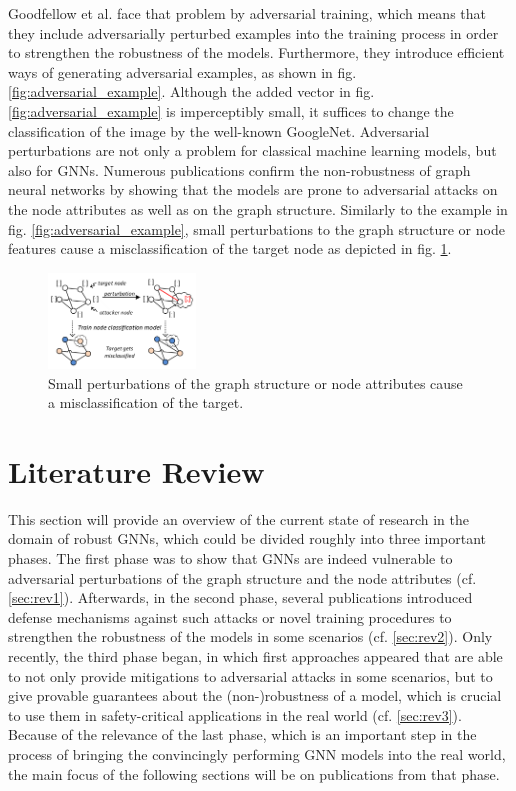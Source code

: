 \documentclass[a4paper,preprint]{sig-alternate}
\begin{document}
Goodfellow et al. \cite{Goodfellow_2015} face that problem by adversarial training, which means that they include adversarially 
perturbed examples into the training process in order to strengthen the robustness of the models. Furthermore, they introduce 
efficient ways of generating adversarial examples, as shown in fig. \ref{fig:adversarial_example}.
Although the added vector in fig. \ref{fig:adversarial_example} is imperceptibly small, it suffices to change the classification
of the image by the well-known GoogleNet. \cite{Goodfellow_2015}\newline
Adversarial perturbations are not only a problem for classical machine learning models, but also for GNNs.
Numerous publications confirm the non-robustness of graph neural networks by showing that the models are prone to
adversarial attacks on the node attributes as well as on the graph structure. \cite{Zuegner_2019}
Similarly to the example in fig. \ref{fig:adversarial_example}, small perturbations to the graph structure or node features 
cause a misclassification of the target node as depicted in fig. \ref{fig:adversarial_GNN}.

\begin{figure}[h]
    \centering
    \includegraphics[width=0.35\textwidth]{img/adversarial_GNN.png}
    \caption{Small perturbations of the graph structure or node attributes cause a misclassification of the target. \cite{Zuegner_2018}}
    \label{fig:adversarial_GNN}
\end{figure}

\section{Literature Review}
\label{sec:literature}

This section will provide an overview of the current state of research in the domain of robust GNNs, which could be divided
roughly into three important phases.
The first phase was to show that GNNs are indeed vulnerable to adversarial perturbations of the graph structure and the node attributes (cf. \ref{sec:rev1}).
Afterwards, in the second phase, several publications introduced defense mechanisms against such attacks or novel training procedures 
to strengthen the robustness of the models in some scenarios (cf. \ref{sec:rev2}). Only recently, the third phase began, in which first approaches appeared
that are able to not only provide mitigations to adversarial attacks in some scenarios, but to give provable guarantees about the (non-)robustness 
of a model, which is crucial to use them in safety-critical applications in the real world (cf. \ref{sec:rev3}). Because of the relevance of the last phase, 
which is an important step in the process of bringing the convincingly performing GNN models into the real world, the main focus of the following sections
will be on publications from that phase.
\end{document}
